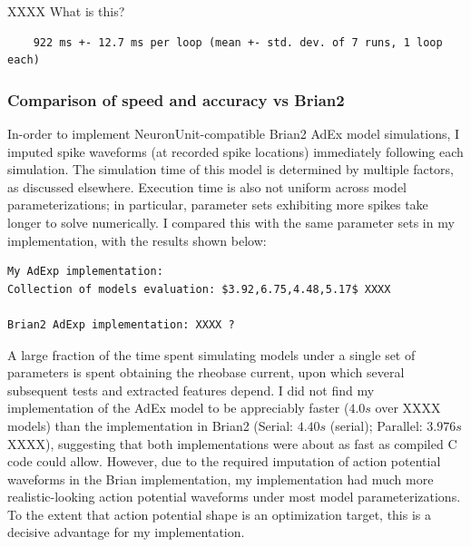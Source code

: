


XXXX What is this?
\begin{verbatim}
    922 ms +- 12.7 ms per loop (mean +- std. dev. of 7 runs, 1 loop each)
\end{verbatim}

\subsubsection{Comparison of speed and accuracy vs Brian2}
In-order to implement NeuronUnit-compatible Brian2 AdEx model simulations, I imputed spike waveforms (at recorded spike locations) immediately following each simulation.
The simulation time of this model is determined by multiple factors, as discussed elsewhere. Execution time is also not uniform across model parameterizations; in particular, parameter sets exhibiting more spikes take longer to solve numerically.
I compared this with the same parameter sets in my implementation, with the results shown below:

\begin{verbatim}
My AdExp implementation:
Collection of models evaluation: $3.92,6.75,4.48,5.17$ XXXX

Brian2 AdExp implementation: XXXX ?
\end{verbatim}

A large fraction of the time spent simulating models under a single set of parameters is spent obtaining the rheobase current, upon which several subsequent tests and extracted features depend.
I did not find my implementation of the AdEx model to be appreciably faster ($4.0s$ over XXXX models) than the implementation in Brian2 (Serial: $4.40s$ (serial); Parallel: $3.976s$ XXXX), suggesting that both implementations were about as fast as compiled C code could allow.
However, due to the required imputation of action potential waveforms in the Brian implementation, my implementation had much more realistic-looking action potential waveforms under most model parameterizations.
To the extent that action potential shape is an optimization target, this is a decisive advantage for my implementation.

